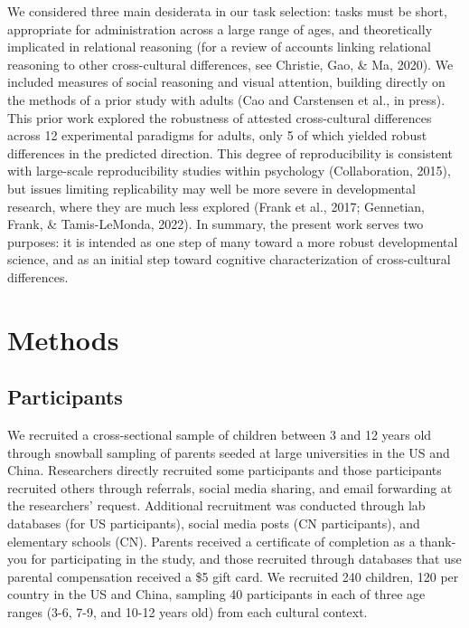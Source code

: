 \documentclass[10pt, letterpaper]{article}
\begin{document}
We considered three main desiderata in our task selection: tasks must be
short, appropriate for administration across a large range of ages, and
theoretically implicated in relational reasoning (for a review of
accounts linking relational reasoning to other cross-cultural
differences, see Christie, Gao, \& Ma, 2020). We included measures of
social reasoning and visual attention, building directly on the methods
of a prior study with adults (Cao and Carstensen et al., in press). This
prior work explored the robustness of attested cross-cultural
differences across 12 experimental paradigms for adults, only 5 of which
yielded robust differences in the predicted direction. This degree of
reproducibility is consistent with large-scale reproducibility studies
within psychology (Collaboration, 2015), but issues limiting
replicability may well be more severe in developmental research, where
they are much less explored (Frank et al., 2017; Gennetian, Frank, \&
Tamis-LeMonda, 2022). In summary, the present work serves two purposes:
it is intended as one step of many toward a more robust developmental
science, and as an initial step toward cognitive characterization of
cross-cultural differences.

\hypertarget{methods}{%
\section{Methods}\label{methods}}

\hypertarget{participants}{%
\subsection{Participants}\label{participants}}

We recruited a cross-sectional sample of children between 3 and 12 years
old through snowball sampling of parents seeded at large universities in
the US and China. Researchers directly recruited some participants and
those participants recruited others through referrals, social media
sharing, and email forwarding at the researchers' request. Additional
recruitment was conducted through lab databases (for US participants),
social media posts (CN participants), and elementary schools (CN).
Parents received a certificate of completion as a thank-you for
participating in the study, and those recruited through databases that
use parental compensation received a \$5 gift card. We recruited 240
children, 120 per country in the US and China, sampling 40 participants
in each of three age ranges (3-6, 7-9, and 10-12 years old) from each
cultural context.
\end{document}
